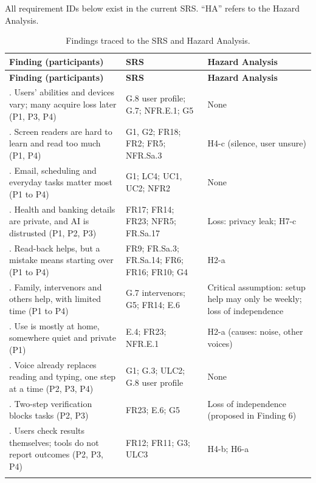 \documentclass[12pt, titlepage]{article}
\begin{document}
All requirement IDs below exist in the current SRS. ``HA'' refers to the Hazard Analysis.

{\small
\setlength{\tabcolsep}{4pt}
\begin{longtable}{>{\raggedright\arraybackslash}p{4.8cm} >{\raggedright\arraybackslash}p{5.4cm} >{\raggedright\arraybackslash}p{5.2cm}}
\caption{Findings traced to the SRS and Hazard Analysis.}\label{tab:trace}\\
\toprule
\textbf{Finding (participants)} & \textbf{SRS} & \textbf{Hazard Analysis}\\
\midrule
\endfirsthead
\toprule
\textbf{Finding (participants)} & \textbf{SRS} & \textbf{Hazard Analysis}\\
\midrule
\endhead
\bottomrule
\endfoot
1. Users' abilities and devices vary; many acquire loss later (P1, P3, P4) & G.8 user profile; G.7; NFR.E.1; G5 & None\\\addlinespace[3pt]
2. Screen readers are hard to learn and read too much (P1, P4) & G1, G2; FR18; FR2; FR5; NFR.Sa.3 & H4-c (silence, user unsure)\\\addlinespace[3pt]
3. Email, scheduling and everyday tasks matter most (P1 to P4) & G1; LC4; UC1, UC2; NFR2 & None\\\addlinespace[3pt]
4. Health and banking details are private, and AI is distrusted (P1, P2, P3) & FR17; FR14; FR23; NFR5; FR.Sa.17 & Loss: privacy leak; H7-c\\\addlinespace[3pt]
5. Read-back helps, but a mistake means starting over (P1 to P4) & FR9; FR.Sa.3; FR.Sa.14; FR6; FR16; FR10; G4 & H2-a\\\addlinespace[3pt]
6. Family, intervenors and others help, with limited time (P1 to P4) & G.7 intervenors; G5; FR14; E.6 & Critical assumption: setup help may only be weekly; loss of independence\\\addlinespace[3pt]
7. Use is mostly at home, somewhere quiet and private (P1) & E.4; FR23; NFR.E.1 & H2-a (causes: noise, other voices)\\\addlinespace[3pt]
8. Voice already replaces reading and typing, one step at a time (P2, P3, P4) & G1; G.3; ULC2; G.8 user profile & None\\\addlinespace[3pt]
9. Two-step verification blocks tasks (P2, P3) & FR23; E.6; G5 & Loss of independence (proposed in Finding 6)\\\addlinespace[3pt]
10. Users check results themselves; tools do not report outcomes (P2, P3, P4) & FR12; FR11; G3; ULC3 & H4-b; H6-a\\\addlinespace[3pt]

\end{longtable}}
\end{document}
